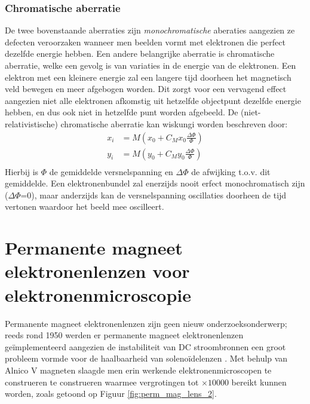\documentclass[we,twoside,openright,a4paper,11pt]{uantwerpenbamathesis}
\begin{document}
\subsubsection{Chromatische aberratie}
De twee bovenstaande aberraties zijn \textit{monochromatische} aberaties aangezien ze defecten veroorzaken wanneer men beelden vormt met elektronen die perfect dezelfde energie hebben. Een andere belangrijke aberratie is chromatische aberratie, welke een gevolg is van variaties in de energie van de elektronen. Een elektron met een kleinere energie zal een langere tijd doorheen het magnetisch veld bewegen en meer afgebogen worden. Dit zorgt voor een vervagend effect aangezien niet alle elektronen afkomstig uit hetzelfde objectpunt dezelfde energie hebben, en dus ook niet in hetzelfde punt worden afgebeeld. De (niet-relativistische) chromatische aberratie kan wiskungi worden beschreven door:
\begin{equation}\label{eq:chr_ab}
    \begin{split}
        x_i & = M\left(x_0+C_Mx_0\frac{\Delta\Phi}{\Phi}\right)\\
        y_i & = M\left(y_0+C_My_0\frac{\Delta\Phi}{\Phi}\right)\\
    \end{split}
\end{equation}
Hierbij is $\Phi$ de gemiddelde versnelspanning en $\Delta\Phi$ de afwijking t.o.v. dit gemiddelde. Een elektronenbundel zal enerzijds nooit erfect monochromatisch zijn ($\Delta\Phi$=0), maar anderzijds kan de versnelspanning oscillaties doorheen de tijd vertonen waardoor het beeld mee oscilleert.\\

\section{Permanente magneet elektronenlenzen voor elektronenmicroscopie}\label{ch:permanent_magnet_lenses}
Permanente magneet elektronenlenzen zijn geen nieuw onderzoeksonderwerp; reeds rond 1950 werden er permanente magneet elektronenlenzen geïmplementeerd aangezien de instabiliteit van DC stroombronnen een groot probleem vormde voor de haalbaarheid van solenoïdelenzen \cite{reisner1951permanent}. Met behulp van Alnico V magneten slaagde men erin werkende elektronenmicroscopen te construeren te construeren waarmee vergrotingen tot $\times10000$ bereikt kunnen worden, zoals getoond op Figuur \ref{fig:perm_mag_lens_2}.\\
\end{document}
